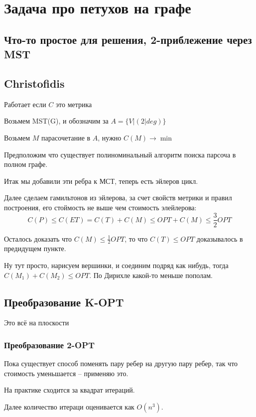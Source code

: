 \section*{Задача про петухов на графе}

\subsection*{Что-то простое для решения, 2-приблежение через MST}

\subsection*{Christofidis}

Работает если $C$ это метрика

Возьмем MST(G), и обозначим за $A = \{V | (2 | deg)\}$

Возьмем $M$ парасочетание в $A$, нужно $C(M) \to \min$

Предположим что существует полиноминальный алгоритм поиска парсоча 
в полном графе.

Итак мы добавили эти ребра к МСТ, теперь есть эйлеров цикл.

Далее сделаем гамильтонов из эйлерова, за счет свойств метрики и
правил построения, его стоймость не выше чем стоимость элейлерова:
\[
    C(P) \leq C(ET) = C(T) + C(M) \leq OPT + C(M) \leq \frac32 OPT    
\]

Осталось доказать что $C(M) \leq \frac12 OPT$, то что $C(T) \leq OPT$
доказывалось в предидущем пункте.

Ну тут просто, нарисуем вершинки, и соединим подряд как нибудь,
тогда $C(M_1) + C(M_2) \leq OPT$. По Дирихле какой-то меньше пополам.

\subsection*{Преобразование K-OPT}

Это всё на плоскости

\subsubsection*{Преобразование 2-OPT}

Пока существует способ поменять пару ребер на другую пару ребер, так
что стоимость уменьшается -- применяю это.

На практике сходится за квадрат итераций.

Далее количество итераци оценивается как $O(n^3)$.

